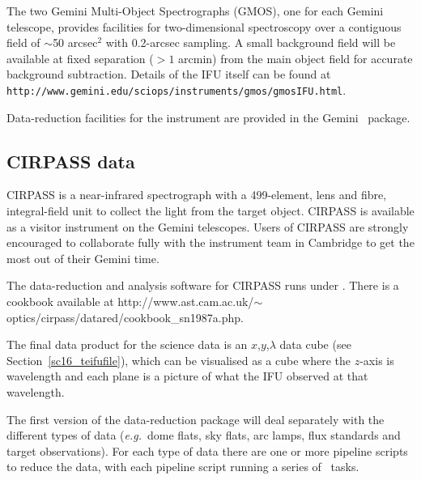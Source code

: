 \documentclass[twoside,11pt]{article}
\newcommand{\htmladdnormallink}[2]{#1}
\newcommand{\htmlref}[2]{#1}
\newcommand{\latex}[1]{#1}
\newcommand{\xlabel}[1]{}
\begin{document}
The two Gemini Multi-Object Spectrographs
(\htmladdnormallink{GMOS}{http://www.gemini.edu/sciops/instruments/gmos/gmosIndex.html}),
one for each Gemini telescope, provides facilities for two-dimensional
spectroscopy over a contiguous field of $\sim$50 arcsec$^2$ with
0.2-arcsec sampling.  A small background field will be available at
fixed separation ($>1$ arcmin) from the main object field for accurate
background subtraction.  Details of the IFU itself can be found at
\htmladdnormallink{{\tt
http://www.gemini.edu/sciops/instruments/gmos/gmosIFU.html}}{http://www.gemini.edu/sciops/instruments/gmos/gmosIFU.html}.

\htmladdnormallink{Data-reduction
facilities}{http://www.gemini.edu/sciops/instruments/gmos/gmosDataRed.html}
for the instrument are provided in the Gemini \IRAFref\ package.

\subsection{\xlabel{sc16_cirpass}CIRPASS data\label{sc16_cirpass}}

\htmladdnormallink{CIRPASS}{http://www.ast.cam.ac.uk/~optics/cirpass/}
is a near-infrared spectrograph with a 499-element, lens and fibre,
integral-field unit to collect the light from the target object.
CIRPASS is available as a visitor instrument on the Gemini telescopes.
Users of CIRPASS are strongly encouraged to collaborate fully with the
instrument team in Cambridge to get the most out of their Gemini time.

The \htmladdnormallink{data-reduction and analysis software for
CIRPASS}{http://www.ast.cam.ac.uk/~optics/cirpass/docs/install_cirp_software.html}
runs under \IRAFref.  There is a 
\htmladdnormallink{cookbook}{http://www.ast.cam.ac.uk/~optics/cirpass/datared/cookbook_sn1987a.php}
available\latex{ at
http://www.ast.cam.ac.uk/$\sim$optics/cirpass/datared/cookbook\_sn1987a.php}.


The final data product for the science data is an $x$,$y$,$\lambda$ 
\htmlref{data cube}{sc16_teifufile}\latex{ (see
Section~\ref{sc16_teifufile})}, which can be visualised as a
cube where the $z$-axis is wavelength and each plane is a picture of
what the IFU observed at that wavelength.

The first version of the \htmladdnormallink{data-reduction
package}{http://www.ast.cam.ac.uk/~optics/cirpass/docs/soft_spec.html}
will deal separately with the different types of data (\emph{e.g.}\
dome flats, sky flats, arc lamps, flux standards and target
observations).  For each type of data there are one or more pipeline
scripts to reduce the data, with each pipeline script running a series
of \IRAF\ tasks.
\end{document}
